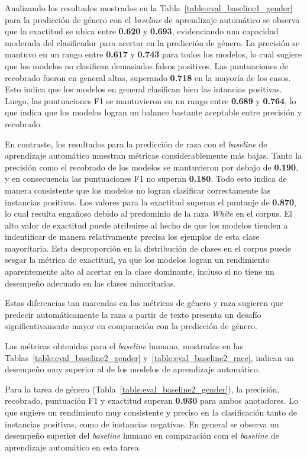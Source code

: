 Analizando los resultados mostrados en la Tabla~\ref{table:eval_baseline1_gender} para la predicci\'on de g\'enero con el 
\emph{baseline} de aprendizaje autom\'atico se observa que la exactitud se ubica entre \textbf{0.620} y \textbf{0.693}, 
evidenciando una capacidad moderada del clasificador para acertar en la predicci\'on de g\'enero. La precisi\'on se 
mantuvo en un rango entre \textbf{0.617} y \textbf{0.743} para todos los modelos, lo cual sugiere que los modelos no
clasifican demasiados falsos positivos. Las puntuaciones de recobrado fueron en general altas, superando \textbf{0.718}
en la mayor\'ia de los casos. Esto indica que los modelos en general clasifican bien las intancias positivas. Luego, las 
puntuaciones F1 se mantuvieron en un rango entre \textbf{0.689} y \textbf{0.764}, lo que indica que los modelos logran
un balance bastante aceptable entre precisi\'on y recobrado.

En contraste, los resultados para la predicci\'on de raza con el \emph{baseline} de aprendizaje autom\'atico 
muestran m\'etricas considerablemente m\'as bajas. Tanto la precisi\'on como el recobrado de los modelos se
mantuvieron por debajo de \textbf{0.190}, y en consecuencia las puntuaciones F1 no superan \textbf{0.180}. Todo
esto indica de manera consistente que los modelos no logran clasificar correctamente las instancias positivas. 
Los valores para la exactitud superan el puntanje de \textbf{0.870}, lo cual resulta enga\~noso debido al 
predominio de la raza \emph{White} en el corpus. El alto valor de exactitud puede atribuirse al hecho de que 
los modelos tienden a indentificar de manera relativamente precisa los ejemplos de esta clase mayoritaria. Esta 
desproporci\'on en la distribuci\'on de clases en el corpus puede sesgar la m\'etrica de exactitud, ya que los 
modelos logran un rendimiento aparentemente alto al acertar en la clase dominante, incluso si no tiene un 
desempe\~no adecuado en las clases minoritarias. 

Estas diferencias tan marcadas en las m\'etricas de g\'enero y raza sugieren que predecir autom\'aticamente la 
raza a partir de texto presenta un desaf\'io significativamente mayor en comparaci\'on con la predicci\'on de 
g\'enero. 

Las m\'etricas obtenidas para el \emph{baseline} humano, mostradas en las 
Tablas~\ref{table:eval_baseline2_gender} y~\ref{table:eval_baseline2_race}, indican un desempe\~no muy 
superior al de los modelos de aprendizaje autom\'atico. 

Para la tarea de g\'enero (Tabla~\ref{table:eval_baseline2_gender}), la precisi\'on, recobrado, 
puntuaci\'on F1 y exactitud superan \textbf{0.930} para ambos anotadores. Lo que sugiere un 
rendimiento muy consistente y preciso en la clasificaci\'on tanto de instancias positivas, 
como de instancias negativas. En general se observa un desempe\~no superior del 
\emph{baseline} humano en comparaci\'on com el \emph{baseline} de aprendizaje autom\'atico en 
esta tarea.


